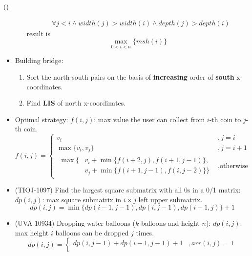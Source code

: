 \begin{theorem}{()}
\begin{itemize}
\begin{enumerate}
\begin{equation}
\begin{aligned}
                    & \forall j < i \land width(j) > width(i) \land depth(j) > depth(i)
                \end{aligned}
            \end{equation} result is \begin{equation}
                \max_{0 < i < n}\{msh(i)\}
            \end{equation}
        \end{enumerate}
        \item Building bridge: \begin{enumerate}
            \item Sort the north-south pairs on the basis of \textbf{increasing} order of \textbf{south} x-coordinates.
            \item Find \textbf{LIS} of north x-coordinates.
        \end{enumerate}
        \item Optimal strategy: $f(i, j)$: max value the user can collect from $i$-th coin to $j$-th coin.\begin{equation}
            f(i, j) = \begin{cases}
                v_i &, j = i \\
                \max\{v_i, v_j\} &, j = i + 1 \\
                \begin{aligned}
                    \max\{& v_i + \min\{f(i + 2, j), f(i + 1, j -1)\}, \\
                    & v_j + \min\{f(i + 1, j -1), f(i, j - 2)\}\}
                \end{aligned} &, \text{otherwise}
            \end{cases}
        \end{equation}
        \item (TIOJ-1097) Find the largest square submatrix with all 0s in a 0/1 matrix: $dp(i, j)$: max square submatrix in $i \times j$ left upper submatrix. \begin{equation}
            dp(i, j) = \min\{dp(i − 1, j − 1), dp(i, j − 1), dp(i − 1,j)\} + 1
        \end{equation} 
        \item (UVA-10934) Dropping water balloons ($k$ balloons and height $n$): $dp(i, j)$: max height $i$ balloons can be dropped $j$ times. \begin{equation}
            dp(i, j) = \begin{cases}
                dp(i, j - 1) + dp(i - 1, j - 1) + 1 &, arr(i, j) = 1 \\

\end{cases}
\end{equation}
\end{itemize}
\end{theorem}
